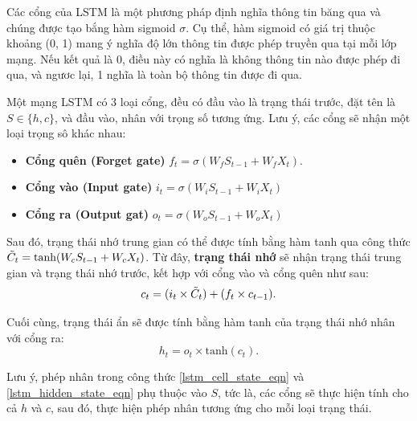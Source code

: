     Các cổng của LSTM là một phương pháp định nghĩa thông tin băng qua và chúng được tạo bắng hàm sigmoid $\sigma$. Cụ thể, hàm sigmoid có giá trị thuộc khoảng (0, 1) mang ý nghĩa độ lớn thông tin được phép truyền qua tại mỗi lớp mạng. Nếu kết quả là 0,  điều này có nghĩa là không thông tin nào được phép đi qua, và ngươc lại, 1 nghĩa là toàn bộ thông tin được đi qua.
    
    Một mạng LSTM có 3 loại cổng, đều có đầu vào là trạng thái trước, đặt tên là $S \in \{h, c\}$, và đầu vào, nhân với trọng số tương ứng. Lưu ý, các cổng sẽ nhận một loại trọng sô khác nhau:
    \begin{itemize}
        \item \textbf{Cổng quên (Forget gate)} $f_t = \sigma(W_fS_{t-1} + W_fX_t)$.
        \item \textbf{Cổng vào (Input gate)} $i_t = \sigma(W_iS_{t-1} + W_iX_t)$
        \item \textbf{Cổng ra (Output gat)} $o_t = \sigma(W_oS_{t-1} + W_oX_t)$
    \end{itemize}
    
    Sau đó, trạng thái nhớ trung gian có thể được tính bằng hàm tanh qua công thức $\Tilde{C}_t = \text{tanh}(W_cS_{t-1} + W_cX_t)$. Từ đây, \textbf{trạng thái nhớ} sẽ nhận trạng thái trung gian và trạng thái nhớ trước, kết hợp với cổng vào và cổng quên như sau:
    \begin{equation} \label{lstm_cell_state_eqn}
        c_t = (i_t\times\Tilde{C}_t) + (f_t\times c_{t - 1}).
    \end{equation}
    
    Cuối cùng, trạng thái ẩn sẽ được tính bằng hàm tanh của trạng thái nhớ nhân với cổng ra:
    \begin{equation} \label{lstm_hidden_state_eqn}
        h_t = o_t\times\text{tanh}(c_t).
    \end{equation}
    
    Lưu ý, phép nhân trong công thức \ref{lstm_cell_state_eqn} và \ref{lstm_hidden_state_eqn} phụ thuộc vào $S$, tức là, các cổng sẽ thực hiện tính cho cả $h$ và $c$, sau đó, thực hiện phép nhân tương ứng cho mỗi loại trạng thái.